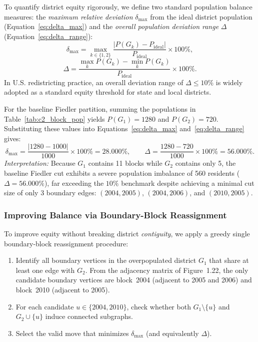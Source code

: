 \documentclass[11pt, a4paper]{article}
\begin{document}
To quantify district equity rigorously, we define two standard population balance measures: the \textit{maximum relative deviation} $\delta_{\max}$ from the ideal district population (Equation~\ref{eq:delta_max}) and the \textit{overall population deviation range} $\Delta$ (Equation~\ref{eq:delta_range}):
\begin{equation}
\delta_{\max} = \max_{k \in \{1, 2\}} \frac{|P(G_k) - P_{\text{ideal}}|}{P_{\text{ideal}}} \times 100\%,
\label{eq:delta_max}
\end{equation}
\begin{equation}
\Delta = \frac{\max_k P(G_k) - \min_k P(G_k)}{P_{\text{ideal}}} \times 100\%.
\label{eq:delta_range}
\end{equation}
In U.S. redistricting practice, an overall deviation range of $\Delta \le 10\%$ is widely adopted as a standard equity threshold for state and local districts.

For the baseline Fiedler partition, summing the populations in Table~\ref{tab:c2_block_pop} yields $P(G_1) = 1280$ and $P(G_2) = 720$. Substituting these values into Equations~\eqref{eq:delta_max} and~\eqref{eq:delta_range} gives:
\[
\delta_{\max} = \frac{|1280 - 1000|}{1000} \times 100\% = 28.000\%, \qquad \Delta = \frac{1280 - 720}{1000} \times 100\% = 56.000\%.
\]
\textit{Interpretation:} Because $G_1$ contains 11 blocks while $G_2$ contains only 5, the baseline Fiedler cut exhibits a severe population imbalance of 560 residents ($\Delta = 56.000\%$), far exceeding the $10\%$ benchmark despite achieving a minimal cut size of only 3 boundary edges: $(2004, 2005)$, $(2004, 2006)$, and $(2010, 2005)$.

\subsubsection{Improving Balance via Boundary-Block Reassignment}

To improve equity without breaking district \textit{contiguity}, we apply a greedy single boundary-block reassignment procedure:
\begin{enumerate}
\item Identify all boundary vertices in the overpopulated district $G_1$ that share at least one edge with $G_2$. From the adjacency matrix of Figure~1.22, the only candidate boundary vertices are block~2004 (adjacent to 2005 and 2006) and block~2010 (adjacent to 2005).
\item For each candidate $u \in \{2004, 2010\}$, check whether both $G_1 \setminus \{u\}$ and $G_2 \cup \{u\}$ induce connected subgraphs.
\item Select the valid move that minimizes $\delta_{\max}$ (and equivalently $\Delta$).
\end{enumerate}
\end{document}
